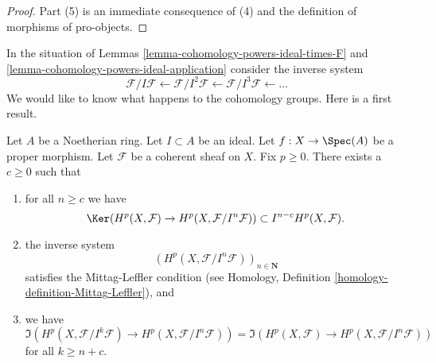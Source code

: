 \begin{proof}
\medskip\noindent
Part (5) is an immediate consequence of (4) and the definition of
morphisms of pro-objects.
\end{proof}

\noindent
In the situation of Lemmas \ref{lemma-cohomology-powers-ideal-times-F} and
\ref{lemma-cohomology-powers-ideal-application} consider the inverse
system
$$
\mathcal{F}/I\mathcal{F} \leftarrow
\mathcal{F}/I^2\mathcal{F} \leftarrow
\mathcal{F}/I^3\mathcal{F} \leftarrow \ldots
$$
We would like to know what happens to the cohomology groups.
Here is a first result.

\begin{lemma}
\label{lemma-ML-cohomology-powers-ideal}
Let $A$ be a Noetherian ring.
Let $I \subset A$ be an ideal.
Let $f : X \to \Spec(A)$ be a proper morphism.
Let $\mathcal{F}$ be a coherent sheaf on $X$.
Fix $p \geq 0$. There exists a $c \geq 0$ such that
\begin{enumerate}
\item for all $n \geq c$ we have
$$
\Ker(H^p(X, \mathcal{F}) \to H^p(X, \mathcal{F}/I^n\mathcal{F})) \subset
I^{n - c}H^p(X, \mathcal{F}).
$$
\item the inverse system
$$
\left(H^p(X, \mathcal{F}/I^n\mathcal{F})\right)_{n \in \mathbf{N}}
$$
satisfies the Mittag-Leffler condition (see
Homology, Definition \ref{homology-definition-Mittag-Leffler}), and
\item we have
$$
\Im(H^p(X, \mathcal{F}/I^k\mathcal{F})
\to H^p(X, \mathcal{F}/I^n\mathcal{F}))
=
\Im(H^p(X, \mathcal{F})
\to H^p(X, \mathcal{F}/I^n\mathcal{F}))
$$
for all $k \geq n + c$.
\end{enumerate}
\end{lemma}

